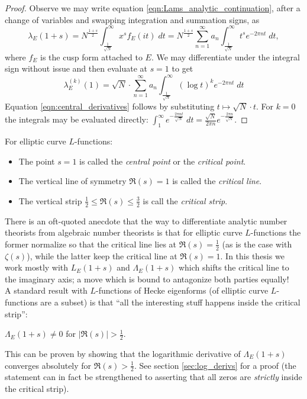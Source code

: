 \documentclass[10pt]{article}
\begin{document}
\begin{proof}
Observe we may write equation \ref{eqn:Lams_analytic_continuation}, after a change of variables and swapping integration and summation signs, as
\begin{equation*}
\lambda_E(1+s) = N^{\frac{1+s}{2}}  \int_{\frac{1}{\sqrt{N}}}^{\infty} x^s f_E(it) \; dt  = N^{\frac{1+s}{2}}  \sum_{n=1}^\infty a_n \int_{\frac{1}{\sqrt{N}}}^{\infty} t^s e^{-2\pi nt} \; dt,
\end{equation*}
where $f_E$ is the cusp form attached to $E$. We may differentiate under the integral sign without issue and then evaluate at $s=1$ to get
\begin{equation*}
\lambda_E^{(k)}(1) = \sqrt{N}\cdot \sum_{n=1}^\infty a_n \int_{\frac{1}{\sqrt{N}}}^{\infty} (\log t)^k e^{-2\pi n t} \; dt
\end{equation*}
Equation \ref{eqn:central_derivatives} follows by substituting $t \mapsto \sqrt{N} \cdot t$. For $k=0$ the integrals may be evaluated directly: $\int_{1}^{\infty} e^{-\frac{2\pi n t}{\sqrt{N}}} \; dt = \frac{\sqrt{N}}{2\pi n} e^{-\frac{2\pi n}{\sqrt{N}}}$.
\end{proof}

\begin{definition} For elliptic curve $L$-functions:
\begin{itemize}
\item The point $s=1$ is called the {\it central point} or the {\it critical point}.
\item The vertical line of symmetry $\Re(s)=1$ is called the {\it critical line}.
\item The vertical strip $\frac{1}{2} \le \Re(s) \le \frac{3}{2}$ is call the {\it critical strip}.
\end{itemize}
\end{definition}

There is an oft-quoted anecdote that the way to differentiate analytic number theorists from algebraic number theorists is that for elliptic curve $L$-functions the former normalize so that the critical line lies at $\Re(s) = \frac{1}{2}$ (as is the case with $\zeta(s)$), while the latter keep the critical line at $\Re(s)=1$. In this thesis we work mostly with $L_E(1+s)$ and $\Lambda_E(1+s)$ which shifts the critical line to the imaginary axis; a move which is bound to antagonize both parties equally! \\

A standard result with $L$-functions of Hecke eigenforms (of elliptic curve $L$-functions are a subset) is that ``all the interesting stuff happens inside the critical strip'':
\begin{proposition}
$\Lambda_E(1+s) \ne 0$ for $|\Re(s)| > \frac{1}{2}$.
\end{proposition}
This can be proven by showing that the logarithmic derivative of $\Lambda_E(1+s)$ converges absolutely for $\Re(s) > \frac{1}{2}$. See section \ref{sec:log_derivs} for a proof (the statement can in fact be strengthened to asserting that all zeros are {\it strictly} inside the critical strip). \\
\end{document}
